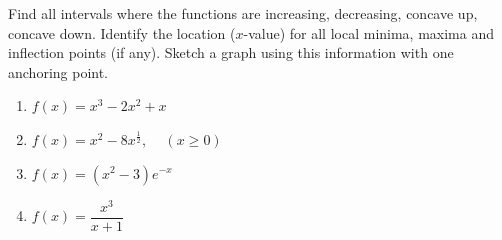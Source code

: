 \documentclass{ximera}
\begin{document}
\begin{exercise}
    Find all intervals where the functions are increasing, decreasing, concave up, concave down.  Identify the location ($x$-value) for all local minima, maxima and inflection points (if any).   Sketch a graph using this information with one anchoring point.\\
\begin{enumerate}
    \item $f(x)=x^3-2x^2+x$
    \item $f(x)=x^2-8x^{\frac{1}{2}},\,\,\,\,\,\,\, (x\geq 0)$
    \item $f(x)=(x^2-3)e^{-x}$ 
    \item $f(x)=\dfrac{x^3}{x+1}$
    
\end{enumerate}
\end{exercise}
\end{document}

